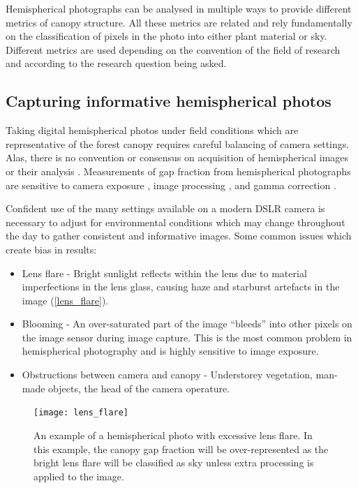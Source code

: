 \documentclass[11pt,a4paper]{article}
\begin{document}
Hemispherical photographs can be analysed in multiple ways to provide different metrics of canopy structure. All these metrics are related and rely fundamentally on the classification of pixels in the photo into either plant material or sky. Different metrics are used depending on the convention of the field of research and according to the research question being asked. 

\subsection{Capturing informative hemispherical photos}

Taking digital hemispherical photos under field conditions which are representative of the forest canopy requires careful balancing of camera settings. Alas, there is no convention or consensus on acquisition of hemispherical images or their analysis \citep{Beckschafer2013}. Measurements of gap fraction from hemispherical photographs are sensitive to camera exposure \citep{Macfarlane2000}, image processing \citep{Jonckheere2004}, and gamma correction \citep{Macfarlane2007 see Chianucci2019}. 

Confident use of the many settings available on a modern DSLR camera is necessary to adjust for environmental conditions which may change throughout the day to gather consistent and informative images. Some common issues which create bias in results:

\begin{itemize}
	\item{Lens flare - Bright sunlight reflects within the lens due to material imperfections in the lens glass, causing haze and starburst artefacts in the image (\autoref{lens_flare}).}
	\item{Blooming - An over-saturated part of the image ``bleeds'' into other pixels on the image sensor during image capture. This is the most common problem in hemispherical photography and is highly sensitive to image exposure.}
	\item{Obstructions between camera and canopy - Understorey vegetation, man-made objects, the head of the camera operature.}
\end{itemize}

\begin{figure}[H]
\centering
	\texttt{[image: lens\_flare]}
	\caption{An example of a hemispherical photo with excessive lens flare. In this example, the canopy gap fraction will be over-represented as the bright lens flare will be classified as sky unless extra processing is applied to the image.}
	\label{lens_flare}
\end{figure}
\end{document}
